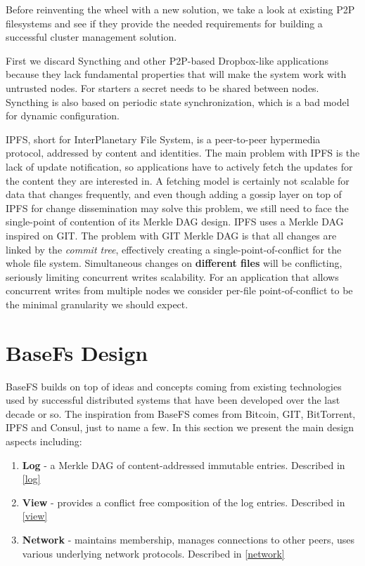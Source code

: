 \documentclass{sig-alternate}
\begin{document}
Before reinventing the wheel with a new solution, we take a look at existing P2P filesystems and see if they provide the needed requirements for building a successful cluster management solution. 

First we discard Syncthing and other P2P-based Dropbox-like applications because they lack fundamental properties that will make the system work with untrusted nodes. 
For starters a secret needs to be shared between nodes. Syncthing is also based on periodic state synchronization, which is a bad model for dynamic configuration.

IPFS, short for InterPlanetary File System, is a peer-to-peer hypermedia protocol, addressed by content and identities. The main problem with IPFS is the lack of update notification, so applications have to actively fetch the updates for the content they are interested in. A fetching model is certainly not scalable for data that changes frequently, and even though adding a gossip layer on top of IPFS for change dissemination may solve this problem, we still need to face the single-point of contention of its Merkle DAG design. IPFS uses a Merkle DAG inspired on GIT. The problem with GIT Merkle DAG is that all changes are linked by the \textit{commit tree}, effectively creating a single-point-of-conflict for the whole file system. 
Simultaneous changes on \textbf{different files} will be conflicting, seriously limiting concurrent writes scalability. For an application that allows concurrent writes from multiple nodes we consider per-file point-of-conflict to be the minimal granularity we should expect.


\section{BaseFs Design}

BaseFS builds on top of ideas and concepts coming from existing technologies used by successful distributed systems that have been developed over the last decade or so. The inspiration from BaseFS comes from Bitcoin, GIT, BitTorrent, IPFS and Consul, just to name a few. In this section we present the main design aspects including:

\begin{enumerate}
\item \textbf{Log} - a Merkle DAG of content-addressed immutable entries. Described in \ref{log}
\item \textbf{View} - provides a conflict free composition of the log entries. Described in \ref{view}
\item \textbf{Network} - maintains membership, manages connections to other peers, uses various underlying network protocols. Described in \ref{network}
\end{enumerate}
\end{document}

